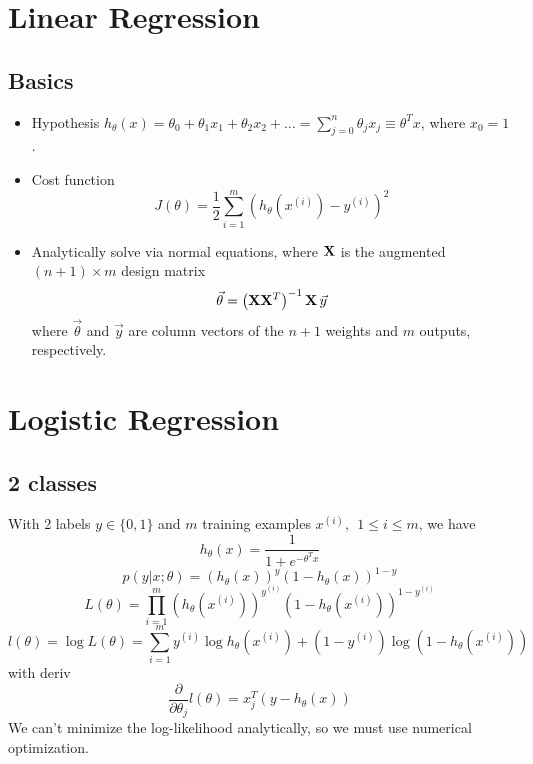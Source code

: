 \documentclass[11pt]{article}
\begin{document}
\newpage
\section{Linear Regression}
\label{sec:linreg}
\subsection{Basics}
\begin{itemize}
  \item Hypothesis
  $h_\theta(x) = \theta_0 + \theta_1 x_1 + \theta_2 x_2 + \dots = \sum_{j=0}^{n}
  \theta_j x_j \equiv \theta^T x$, where $x_0 = 1$.
  \item Cost function
  \begin{equation}
    J(\theta) = \frac{1}{2} \sum_{i=1}^m \left(h_\theta(x^{(i)}) - y^{(i)}\right)^2
  \end{equation}
  \item Analytically solve via normal equations, where $\mathbf{X}$ is the augmented
  $(n+1) \times m$ design matrix
  \begin{equation}
    \vec{\theta} = \left(\mathbf{X} \mathbf{X}^T \right)^{-1} \mathbf{X}\, \vec{y}
  \end{equation}
  where $\vec{\theta}$ and $\vec{y}$ are column vectors of the $n+1$ weights and $m$
  outputs, respectively.
\end{itemize}



\section{Logistic Regression}
\label{sec:logreg}
\subsection{2 classes}
With 2 labels $y \in \{0,1\}$ and $m$ training examples $x^{(i)},\ \ 1 \leq i \leq m$,
we have
\begin{equation}
  h_\theta (x) = \frac{1}{1 + e^{-\theta^T x}}
\end{equation}
\begin{equation}
  p(y|x;\theta) = (h_\theta (x))^y (1 - h_\theta (x))^{1-y}
\end{equation}
\begin{equation}
  L(\theta) = \prod_{i=1}^m (h_\theta (x^{(i)}))^{y^{(i)}} (1 - h_\theta
  (x^{(i)}))^{1-y^{(i)}} 
\end{equation}
\begin{equation}
  l(\theta) = \log L(\theta) = \sum_{i=1}^m y^{(i)} \log h_\theta (x^{(i)}) + (1 -
  y^{(i)}) \log(1 - h_\theta  (x^{(i)}))
\end{equation}
with deriv
\begin{equation}
  \frac{\partial}{\partial \theta_j} l(\theta) = x_j^T (y - h_\theta (x))
\end{equation}
We can't minimize the log-likelihood analytically, so we must use numerical
optimization.
\end{document}
